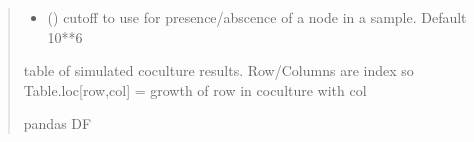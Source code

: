 \documentclass[letterpaper,10pt,english]{sphinxmanual}
\begin{document}
\begin{fulllineitems}
\begin{quote}
\begin{description}
\begin{itemize}
\item {} 
\sphinxAtStartPar
{} () \textendash{} cutoff to use for presence/abscence of a node in a sample. Default 10**\sphinxhyphen{}6

\end{itemize}

\sphinxAtStartPar
table of simulated co\sphinxhyphen{}culture results. Row/Columns are index so Table.loc{[}row,col{]} = growth of row in coculture with col

\sphinxAtStartPar
pandas DF

\end{description}\end{quote}

\end{fulllineitems}

\end{document}
